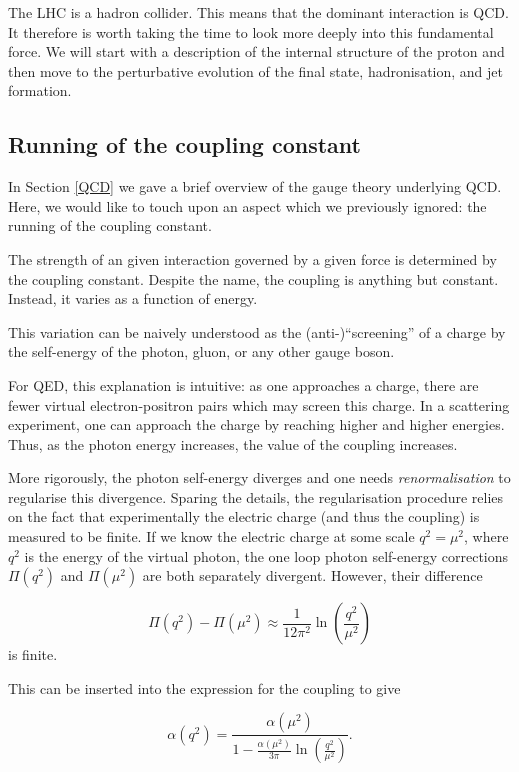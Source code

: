 \documentclass[10pt,a4paper]{book}
\begin{document}
The LHC is a hadron collider. This means that the dominant interaction is QCD. It therefore is worth taking the time to look more deeply into this fundamental force. We will start with a description of the internal structure of the proton and then move to the perturbative evolution of the final state, hadronisation, and jet formation. 

\subsection{Running of the coupling constant}

In Section \ref{QCD} we gave a brief overview of the gauge theory underlying QCD. Here, we would like to touch upon an aspect which we previously ignored: the running of the coupling constant. 

The strength of an given interaction governed by a given force is determined by the coupling constant. Despite the name, the coupling is anything but constant. Instead, it varies as a function of energy. 

This variation can be naively understood as the (anti-)``screening'' of a charge by the self-energy of the photon, gluon, or any other gauge boson. 

For QED, this explanation is intuitive: as one approaches a charge, there are fewer virtual electron-positron pairs which may screen this charge. In a scattering experiment, one can approach the charge by reaching higher and higher energies. Thus, as the photon energy increases, the value of the coupling increases.

More rigorously, the photon self-energy diverges and one needs \emph{renormalisation} to regularise this divergence. Sparing the details, the regularisation procedure relies on the fact that experimentally the electric charge (and thus the coupling) is measured to be finite. If we know the electric charge at some scale $q^2 = \mu^2$, where $q^2$ is the energy of the virtual photon, the one loop photon self-energy corrections $\Pi(q^2)$ and $\Pi(\mu^2)$ are both separately divergent. However, their difference

\begin{equation}
    \Pi(q^2) - \Pi(\mu^2) \approx \frac{1}{12\pi^2}\ln\left(\frac{q^2}{\mu^2}\right)
\end{equation}
is finite. 

This can be inserted into the expression for the coupling to give

\begin{equation}
\alpha(q^2) = \frac{\alpha(\mu^2)}{1 - \frac{\alpha(\mu^2)}{3\pi}\ln\left(\frac{q^2}{\mu^2}\right)}.    
\end{equation}
\end{document}
